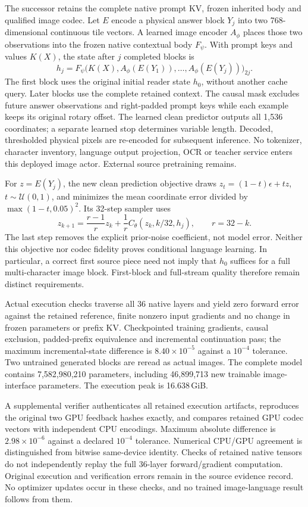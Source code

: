 \documentclass[10pt,a4paper]{article}
\begin{document}
The successor retains the complete native prompt KV, frozen inherited body and
qualified image codec. Let $E$ encode a physical answer block $Y_j$ into two
768-dimensional continuous tile vectors. A learned image encoder $A_\phi$
places those two observations into the frozen native contextual body $F_\psi$.
With prompt keys and values $K(X)$, the state after $j$ completed blocks is
\[
 h_j=F_\psi\bigl(K(X),A_\phi(E(Y_1)),\ldots,A_\phi(E(Y_j))\bigr)_{2j}.
\]
The first block uses the original initial reader state $h_0$, without another
cache query. Later blocks use the complete retained context. The causal mask
excludes future answer observations and right-padded prompt keys while each
example keeps its original rotary offset. The learned clean predictor outputs
all 1,536 coordinates; a separate learned stop determines variable length.
Decoded, thresholded physical pixels are re-encoded for subsequent inference.
No tokenizer, character inventory, language output projection, OCR or teacher
service enters this deployed image actor. External source pretraining remains.

For $z=E(Y_j)$, the new clean prediction objective draws
$z_t=(1-t)\epsilon+tz$, $t\sim\mathcal U(0,1)$, and minimizes the mean coordinate
error divided by $\max(1-t,0.05)^2$. Its 32-step sampler uses
\[
 z_{k+1}=\frac{r-1}{r}z_k+\frac1r C_\theta(z_k,k/32,h_j),\qquad r=32-k.
\]
The last step removes the explicit prior-noise coefficient, not model error.
Neither this objective nor codec fidelity proves conditional language learning.
In particular, a correct first source piece need not imply that $h_0$ suffices
for a full multi-character image block. First-block and full-stream quality
therefore remain distinct requirements.

Actual execution checks traverse all 36 native layers and yield zero forward
error against the retained reference, finite nonzero input gradients and no
change in frozen parameters or prefix KV. Checkpointed training gradients,
causal exclusion, padded-prefix equivalence and incremental continuation pass;
the maximum incremental-state difference is $8.40\times10^{-5}$ against a
$10^{-4}$ tolerance. Two untrained generated blocks are reread as actual images.
The complete model contains 7,582,980,210 parameters, including 46,899,713 new
trainable image-interface parameters. The execution peak is 16.638\,GiB.

A supplemental verifier authenticates all retained execution artifacts,
reproduces the original two GPU feedback hashes exactly, and compares retained
GPU codec vectors with independent CPU encodings. Maximum absolute difference
is $2.98\times10^{-6}$ against a declared $10^{-4}$ tolerance. Numerical CPU/GPU
agreement is distinguished from bitwise same-device identity. Checks of retained
native tensors do not independently replay the full 36-layer forward/gradient
computation. Original execution and verification errors remain in the source
evidence record. No optimizer updates occur in these checks, and no trained
image-language result follows from them.
\end{document}
